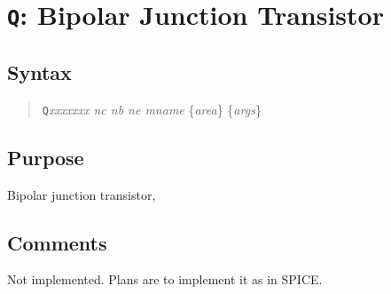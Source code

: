 \section{{\tt Q}: Bipolar Junction Transistor}
\subsection{Syntax}
\begin{verse}
{\tt Q}{\it xxxxxxx nc nb ne mname} \{{\it area}\} \{{\it args}\}
\end{verse}
\subsection{Purpose}

Bipolar junction transistor,
\subsection{Comments}

Not implemented.
Plans are to implement it as in SPICE.
